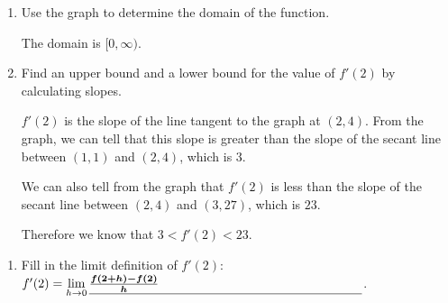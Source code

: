 \documentclass{article}
\begin{document}
\begin{enumerate}
\begin{minipage}[t]{2in}\vspace{0pt}
\end{minipage}
\begin{minipage}[t]{4in}
\begin{enumerate}
    \item
    \begin{problem}
        Use the graph to determine the domain of the function.
    \end{problem}
    \pspace{36pt}

    \begin{solution}
        The domain is $[0,\infty)$.
    \end{solution}

    \item
    \begin{problem}
        Find an upper bound and a lower bound for the value of $f'(2)$ by calculating slopes.
    \end{problem}
    \pspace{2in}
    
    \begin{solution}
        $f'(2)$ is the slope of the line tangent to the graph at $(2,4)$. From the graph, we can tell that this slope is greater than the slope of the secant line between $(1,1)$ and $(2,4)$, which is $3$.

        We can also tell from the graph that $f'(2)$ is less than the slope of the secant line between $(2,4)$ and $(3,27)$, which is $23$.

        Therefore we know that $3 < f'(2) < 23$.
    \end{solution}
    
\end{enumerate}
\end{minipage}

\pspace{\newpage}

  \begin{enumerate}[resume]
  \pspace{18pt}
  \item
\begin{problem}
      Fill in the limit definition of $f'(2)$: $f'(2) = \displaystyle
      \lim_{h \to 0} \fitb[\vphantom{\frac{0}{0}}]{3in}{\frac{f(2 + h) - f(2)}{h}}$.
    \end{problem}
\end{enumerate}


\end{enumerate}
\end{document}
